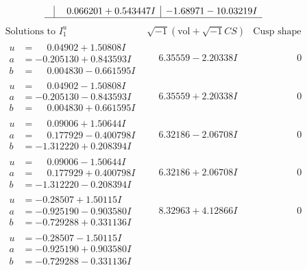 \documentclass[1p]{elsarticle_modified}
\theoremstyle{definition}
\newcommand{\I}{\sqrt{-1}}
\begin{document}
$$\begin{array}{c|c|c}
 & \phantom{-}0.066201 + 0.543447 I & -1.68971 - 10.03219 I\\
 \hline 
 \end{array}$$\newpage$$\begin{array}{c|c|c}  
\text{Solutions to }I^u_{1}& \I (\text{vol} + \sqrt{-1}CS) & \text{Cusp shape}\\
 \hline 
\begin{aligned}
u &= \phantom{-}0.04902 + 1.50808 I \\
a &= -0.205130 + 0.843593 I \\
b &= \phantom{-}0.004830 - 0.661595 I\end{aligned}
 & \phantom{-}6.35559 - 2.20338 I & \phantom{-0.000000 } 0 \\ \hline\begin{aligned}
u &= \phantom{-}0.04902 - 1.50808 I \\
a &= -0.205130 - 0.843593 I \\
b &= \phantom{-}0.004830 + 0.661595 I\end{aligned}
 & \phantom{-}6.35559 + 2.20338 I & \phantom{-0.000000 } 0 \\ \hline\begin{aligned}
u &= \phantom{-}0.09006 + 1.50644 I \\
a &= \phantom{-}0.177929 - 0.400798 I \\
b &= -1.312220 + 0.208394 I\end{aligned}
 & \phantom{-}6.32186 - 2.06708 I & \phantom{-0.000000 } 0 \\ \hline\begin{aligned}
u &= \phantom{-}0.09006 - 1.50644 I \\
a &= \phantom{-}0.177929 + 0.400798 I \\
b &= -1.312220 - 0.208394 I\end{aligned}
 & \phantom{-}6.32186 + 2.06708 I & \phantom{-0.000000 } 0 \\ \hline\begin{aligned}
u &= -0.28507 + 1.50115 I \\
a &= -0.925190 - 0.903580 I \\
b &= -0.729288 + 0.331136 I\end{aligned}
 & \phantom{-}8.32963 + 4.12866 I & \phantom{-0.000000 } 0 \\ \hline\begin{aligned}
u &= -0.28507 - 1.50115 I \\
a &= -0.925190 + 0.903580 I \\
b &= -0.729288 - 0.331136 I\end{aligned}

\end{array}$$
\end{document}
